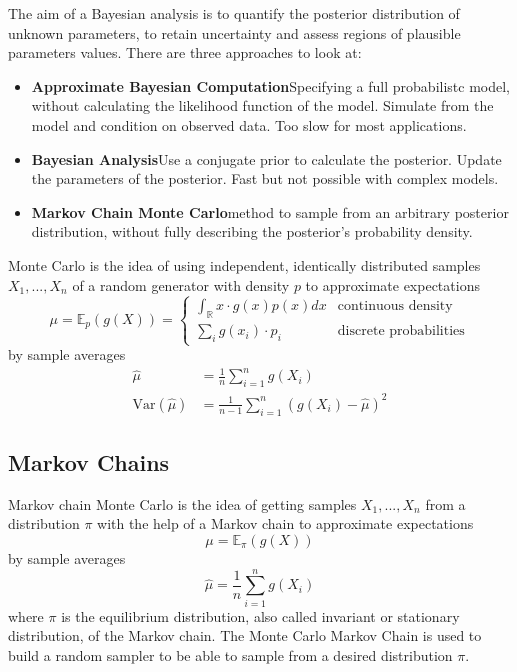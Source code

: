 \documentclass[11pt]{article}
\begin{document}
The aim of a Bayesian analysis is to quantify the posterior distribution of unknown parameters, to retain uncertainty and assess regions of plausible parameters values. There are three approaches to look at:
\begin{itemize}
	\item \textbf{Approximate Bayesian Computation}\quad Specifying a full probabilistc model, without calculating the likelihood function of the model. Simulate from the model and condition on observed data. Too slow for most applications.
	\item \textbf{Bayesian Analysis}\quad Use a conjugate prior to calculate the posterior. Update the parameters of the posterior. Fast but not possible with complex models.
	\item \textbf{Markov Chain Monte Carlo}\quad method to sample from an arbitrary posterior distribution, without fully describing the posterior’s probability density.
\end{itemize}

Monte Carlo is the idea of using independent, identically distributed samples $X_1 , ... , X_n$ of a random generator with density $p$ to approximate expectations
\begingroup
\renewcommand*{\arraystretch}{1.5}
\begin{equation*}
	\mu = \mathbb{E}_p(g(X)) = \left\{ \begin{matrix}
		\int_{\mathbb{R}} x\cdot g(x)p(x) dx & \text{continuous density}\\
		\sum_{i} g(x_i) \cdot p_i &\text{discrete probabilities}
	\end{matrix} \right.
\end{equation*}
\endgroup
\noindent
by sample averages 
\begin{align*}
	\widehat{\mu}&=\frac{1}{n}\sum_{i=1}^{n}g(X_i)\\
	\text{Var}(\widehat{\mu}) &= \frac{1}{n-1}\sum_{i=1}^{n}(g(X_i)-\widehat{\mu})^2
\end{align*}

\subsection{Markov Chains}
Markov chain Monte Carlo is the idea of getting samples $X_1 , ... , X_n$ from a distribution $\pi$ with the help of a Markov chain to approximate expectations
\begin{equation*}
	\mu = \mathbb{E}_\pi (g(X))
\end{equation*}
by sample averages
\begin{equation*}
	\widehat{\mu}=\frac{1}{n}\sum_{i=1}^{n}g(X_i)
\end{equation*}
where $\pi$ is the equilibrium distribution, also called invariant or stationary distribution, of the Markov chain. The Monte Carlo Markov Chain is used to build a random sampler to be able to sample from a desired distribution $\pi$.
\end{document}
